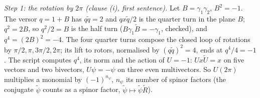 \emph{Step 1: the rotation by $2\pi$ (clause (i), first sentence).} Let $B = \gamma_{1}\gamma_{2}$, $B^{2} = -1$. The versor $q = 1 + B$ has $q\tilde q = 2$ and $q x \tilde q/2$ is the quarter turn in the plane $B$; $q^{2} = 2B$, so $q^{2}/2 = B$ is the half turn ($B\gamma_{1}\tilde B = -\gamma_{1}$, checked), and $q^{4} = (2B)^{2} = -4$. The four quarter turns compose the closed loop of rotations by $\pi/2, \pi, 3\pi/2, 2\pi$; its lift to rotors, normalised by $(q\tilde q)^{2} = 4$, ends at $q^{4}/4 = -1$. The script computes $q^{4}$, its norm and the action of $U = -1$: $Ux\tilde U = x$ on five vectors and two bivectors, $U\psi = -\psi$ on three even multivectors. So $U(2\pi)$ multiplies a monomial by $(-1)^{n_{\psi}}$, $n_{\psi}$ its number of spinor factors (the conjugate $\tilde\psi$ counts as a spinor factor, $\tilde\psi \mapsto \tilde\psi\tilde R$).

